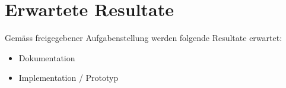 \section{Erwartete Resultate} \label{sec:ErwarteteResultate}
Gemäss freigegebener Aufgabenstellung werden folgende Resultate erwartet:

\begin{itemize}
\item Dokumentation
\item Implementation / Prototyp
\end{itemize}


